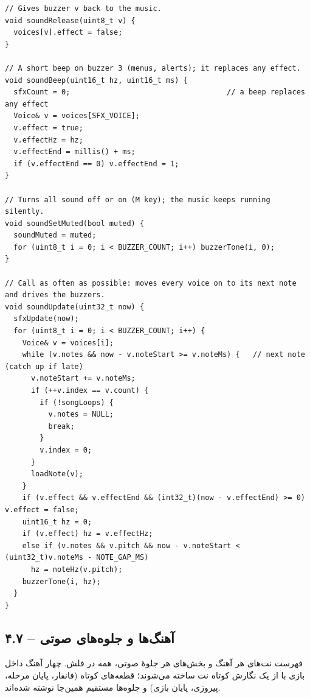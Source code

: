\documentclass[11pt,a4paper]{article}
\begin{document}
\begin{latin}
\begin{lstlisting}[language=Arduino]
// Gives buzzer v back to the music.
void soundRelease(uint8_t v) {
  voices[v].effect = false;
}

// A short beep on buzzer 3 (menus, alerts); it replaces any effect.
void soundBeep(uint16_t hz, uint16_t ms) {
  sfxCount = 0;                                    // a beep replaces any effect
  Voice& v = voices[SFX_VOICE];
  v.effect = true;
  v.effectHz = hz;
  v.effectEnd = millis() + ms;
  if (v.effectEnd == 0) v.effectEnd = 1;
}

// Turns all sound off or on (M key); the music keeps running silently.
void soundSetMuted(bool muted) {
  soundMuted = muted;
  for (uint8_t i = 0; i < BUZZER_COUNT; i++) buzzerTone(i, 0);
}

// Call as often as possible: moves every voice on to its next note and drives the buzzers.
void soundUpdate(uint32_t now) {
  sfxUpdate(now);
  for (uint8_t i = 0; i < BUZZER_COUNT; i++) {
    Voice& v = voices[i];
    while (v.notes && now - v.noteStart >= v.noteMs) {   // next note (catch up if late)
      v.noteStart += v.noteMs;
      if (++v.index == v.count) {
        if (!songLoops) {
          v.notes = NULL;
          break;
        }
        v.index = 0;
      }
      loadNote(v);
    }
    if (v.effect && v.effectEnd && (int32_t)(now - v.effectEnd) >= 0) v.effect = false;
    uint16_t hz = 0;
    if (v.effect) hz = v.effectHz;
    else if (v.notes && v.pitch && now - v.noteStart < (uint32_t)v.noteMs - NOTE_GAP_MS)
      hz = noteHz(v.pitch);
    buzzerTone(i, hz);
  }
}
\end{lstlisting}

\end{latin}

\clearpage
\subsection*{۴.۷  – آهنگ‌ها و جلوه‌های صوتی}
فهرست نت‌های هر آهنگ و بخش‌های هر جلوهٔ صوتی، همه در فلش. چهار آهنگ داخل بازی با  از یک نگارش کوتاه نت ساخته می‌شوند؛ قطعه‌های کوتاه (فانفار، پایان مرحله، پیروزی، پایان بازی) و جلوه‌ها مستقیم همین‌جا نوشته شده‌اند.
\end{document}
